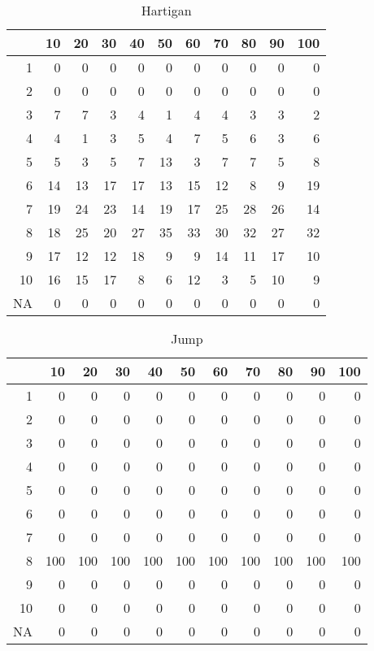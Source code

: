 \documentclass[11pt]{article}
\begin{document}
\begin{table}[H]
\centering
\begin{tabular}{rrrrrrrrrrr}
  \hline
 & 10 & 20 & 30 & 40 & 50 & 60 & 70 & 80 & 90 & 100 \\ 
  \hline
1 & 0 & 0 & 0 & 0 & 0 & 0 & 0 & 0 & 0 & 0 \\ 
  2 & 0 & 0 & 0 & 0 & 0 & 0 & 0 & 0 & 0 & 0 \\ 
  3 & 7 & 7 & 3 & 4 & 1 & 4 & 4 & 3 & 3 & 2 \\ 
  4 & 4 & 1 & 3 & 5 & 4 & 7 & 5 & 6 & 3 & 6 \\ 
  5 & 5 & 3 & 5 & 7 & 13 & 3 & 7 & 7 & 5 & 8 \\ 
  6 & 14 & 13 & 17 & 17 & 13 & 15 & 12 & 8 & 9 & 19 \\ 
  7 & 19 & 24 & 23 & 14 & 19 & 17 & 25 & 28 & 26 & 14 \\ 
  8 & 18 & 25 & 20 & 27 & 35 & 33 & 30 & 32 & 27 & 32 \\ 
  9 & 17 & 12 & 12 & 18 & 9 & 9 & 14 & 11 & 17 & 10 \\ 
  10 & 16 & 15 & 17 & 8 & 6 & 12 & 3 & 5 & 10 & 9 \\ 
  NA & 0 & 0 & 0 & 0 & 0 & 0 & 0 & 0 & 0 & 0 \\ 
   \hline
\end{tabular}
\caption{Hartigan} 
\end{table}
\begin{table}[H]
\centering
\begin{tabular}{rrrrrrrrrrr}
  \hline
 & 10 & 20 & 30 & 40 & 50 & 60 & 70 & 80 & 90 & 100 \\ 
  \hline
1 & 0 & 0 & 0 & 0 & 0 & 0 & 0 & 0 & 0 & 0 \\ 
  2 & 0 & 0 & 0 & 0 & 0 & 0 & 0 & 0 & 0 & 0 \\ 
  3 & 0 & 0 & 0 & 0 & 0 & 0 & 0 & 0 & 0 & 0 \\ 
  4 & 0 & 0 & 0 & 0 & 0 & 0 & 0 & 0 & 0 & 0 \\ 
  5 & 0 & 0 & 0 & 0 & 0 & 0 & 0 & 0 & 0 & 0 \\ 
  6 & 0 & 0 & 0 & 0 & 0 & 0 & 0 & 0 & 0 & 0 \\ 
  7 & 0 & 0 & 0 & 0 & 0 & 0 & 0 & 0 & 0 & 0 \\ 
  8 & 100 & 100 & 100 & 100 & 100 & 100 & 100 & 100 & 100 & 100 \\ 
  9 & 0 & 0 & 0 & 0 & 0 & 0 & 0 & 0 & 0 & 0 \\ 
  10 & 0 & 0 & 0 & 0 & 0 & 0 & 0 & 0 & 0 & 0 \\ 
  NA & 0 & 0 & 0 & 0 & 0 & 0 & 0 & 0 & 0 & 0 \\ 
   \hline
\end{tabular}
\caption{Jump} 
\end{table}
\end{document}
